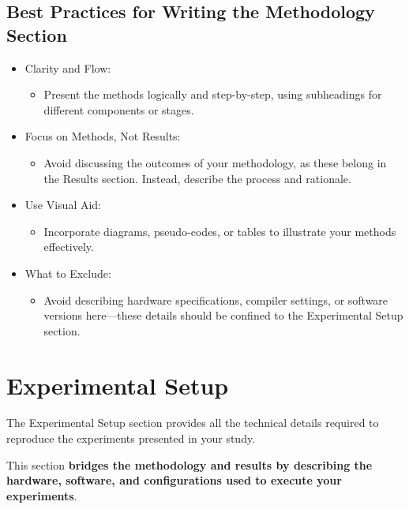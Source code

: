 \documentclass[conference]{IEEEtran}
\begin{document}
\subsection{Best Practices for Writing the Methodology Section}
\begin{itemize}
\item Clarity and Flow:  
\begin{itemize}
   \item Present the methods logically and step-by-step, using subheadings for different components or stages.  
\end{itemize}

\item Focus on Methods, Not Results:  
\begin{itemize}
   \item Avoid discussing the outcomes of your methodology, as these belong in the Results section. Instead, describe the process and rationale.  
\end{itemize}

\item Use Visual Aid:  
\begin{itemize}
   \item Incorporate diagrams, pseudo-codes, or tables to illustrate your methods effectively.  
\end{itemize}

\item What to Exclude:  
\begin{itemize}
   \item Avoid describing hardware specifications, compiler settings, or software versions here—these details should be confined to the Experimental Setup section. 
\end{itemize}
\end{itemize}
\section{Experimental Setup}\label{sec:expsetup}
The  Experimental Setup section provides all the technical details required to reproduce the experiments presented in your study.

This section \textbf{bridges the methodology and results by describing the hardware, software, and configurations used to execute your experiments}.
\end{document}
